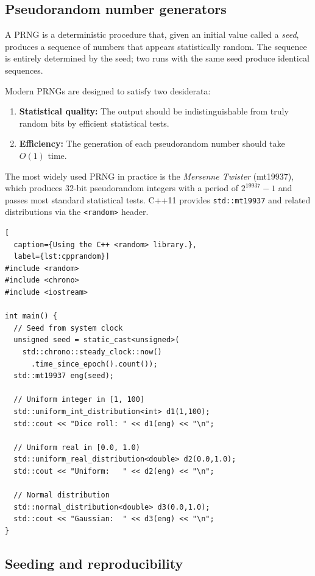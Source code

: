 \documentclass[twoside,12pt]{book}
\theoremstyle{plain}
\theoremstyle{definition}
\theoremstyle{remark}
\begin{document}
\subsection{Pseudorandom number generators}

A PRNG is a deterministic procedure that, given an initial value called a
\emph{seed}, produces a sequence of numbers that appears statistically
random. The sequence is entirely determined by the seed; two runs with the
same seed produce identical sequences.

Modern PRNGs are designed to satisfy two desiderata:
\begin{enumerate}
\item \textbf{Statistical quality:} The output should be indistinguishable
from truly random bits by efficient statistical tests.
\item \textbf{Efficiency:} The generation of each pseudorandom number
should take $O(1)$ time.
\end{enumerate}

The most widely used PRNG in practice is the \emph{Mersenne Twister}
(mt19937), which produces 32-bit pseudorandom integers with a period of
$2^{19937}-1$ and passes most standard statistical tests. C++11 provides
\texttt{std::mt19937} and related distributions via the \texttt{<random>}
header.

\begin{lstlisting}[
  caption={Using the C++ <random> library.},
  label={lst:cpprandom}]
#include <random>
#include <chrono>
#include <iostream>

int main() {
  // Seed from system clock
  unsigned seed = static_cast<unsigned>(
    std::chrono::steady_clock::now()
      .time_since_epoch().count());
  std::mt19937 eng(seed);

  // Uniform integer in [1, 100]
  std::uniform_int_distribution<int> d1(1,100);
  std::cout << "Dice roll: " << d1(eng) << "\n";

  // Uniform real in [0.0, 1.0)
  std::uniform_real_distribution<double> d2(0.0,1.0);
  std::cout << "Uniform:   " << d2(eng) << "\n";

  // Normal distribution
  std::normal_distribution<double> d3(0.0,1.0);
  std::cout << "Gaussian:  " << d3(eng) << "\n";
}
\end{lstlisting}

\subsection{Seeding and reproducibility}
\end{document}
